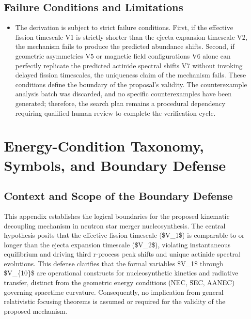 \documentclass[conference]{IEEEtran}
\begin{document}
\subsection{Failure Conditions and Limitations}
\begin{itemize}
\item The derivation is subject to strict failure conditions. First, if the effective fission timescale V1 is strictly shorter than the ejecta expansion timescale V2, the mechanism fails to produce the predicted abundance shifts. Second, if geometric asymmetries V5 or magnetic field configurations V6 alone can perfectly replicate the predicted actinide spectral shifts V7 without invoking delayed fission timescales, the uniqueness claim of the mechanism fails. These conditions define the boundary of the proposal's validity. The counterexample analysis batch was discarded, and no specific counterexamples have been generated; therefore, the search plan remains a procedural dependency requiring qualified human review to complete the verification cycle.
\end{itemize}

\appendices
\section{Energy-Condition Taxonomy, Symbols, and Boundary Defense}
\subsection{Context and Scope of the Boundary Defense}
This appendix establishes the logical boundaries for the proposed kinematic decoupling mechanism in neutron star merger nucleosynthesis. The central hypothesis posits that the effective fission timescale (\$V\_1\$) is comparable to or longer than the ejecta expansion timescale (\$V\_2\$), violating instantaneous equilibrium and driving third r-process peak shifts and unique actinide spectral evolutions. This defense clarifies that the formal variables \$V\_1\$ through \$V\_\{10\}\$ are operational constructs for nucleosynthetic kinetics and radiative transfer, distinct from the geometric energy conditions (NEC, SEC, AANEC) governing spacetime curvature. Consequently, no implication from general relativistic focusing theorems is assumed or required for the validity of the proposed mechanism.
\end{document}
